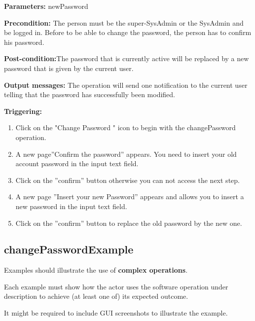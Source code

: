\begin{description}

\item \textbf{Parameters:} newPassword
\item \textbf{Precondition:} The person must be the super-SysAdmin or the
SysAdmin and be logged in. Before to be able to change the password, the person has to confirm his password.
\item \textbf{Post-condition:}The password that is currently active will be
replaced by a new password that is given by the current user.
\item \textbf{Output messages:} The operation will send one notification to the
current user telling that the password  has successfully been modified.


\item \textbf{Triggering:}
\begin{enumerate}
\item Click on the "Change Password " icon to begin with the changePassword
operation.
\item A new page''Confirm the password'' appears. You need to insert your old
account password in the input text field. 
\item Click on the ''confirm'' button otherwise you can not access the next
step.
\item A new page ''Insert your new Password'' appears and allows you to
insert a new password in the input text field.
\item Click on the ''confirm'' button to replace the old password by the new
one.

\end{enumerate}

 
\end{description}

 
\subsection{changePasswordExample}
Examples should illustrate the use of \textbf{complex operations}.

Each example must show how the actor uses the software operation under
description to achieve (at least one of) its expected outcome.

It might be required to include GUI screenshots to illustrate the example.

